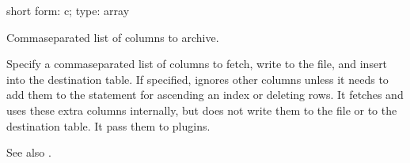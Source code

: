 \documentclass[letterpaper,10pt,english]{sphinxmanual}
\begin{document}

\begin{fulllineitems}
\label{\detokenize{mariadb-archiver:cmdoption-mariadb-archiver-columns}}
short form: \sphinxhyphen{}c; type: array

Comma\sphinxhyphen{}separated list of columns to archive.

Specify a comma\sphinxhyphen{}separated list of columns to fetch, write to the file, and
insert into the destination table.  If specified,  ignores other
columns unless it needs to add them to the  statement for ascending an
index or deleting rows.  It fetches and uses these extra columns internally, but
does not write them to the file or to the destination table.  It  pass
them to plugins.

See also {\hyperref[\detokenize{mariadb-archiver:cmdoption-mariadb-archiver-primary-key-only}]{}}.

\end{fulllineitems}

\end{document}

